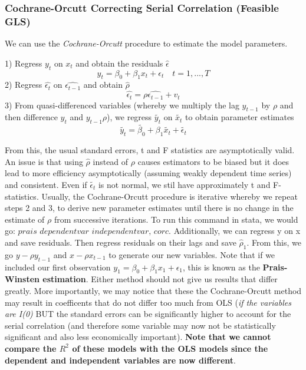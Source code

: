 \documentclass[11pt, oneside]{article}
\theoremstyle{definition}
\begin{document}
\subsubsection{Cochrane-Orcutt Correcting Serial Correlation (Feasible GLS)}
We can use the \textit{Cochrane-Orcutt} procedure to estimate the model parameters.

\begin{center}
  1) Regress $y_t$ on $x_t$ and obtain the residuals $\hat{\epsilon}$
$$
y_t = \beta_0 + \beta_1 x_t + \epsilon_t \quad t=1,...,T
$$
  2) Regress $\hat{\epsilon_t}$ on $\hat{\epsilon_{t-1}}$ and obtain $\hat{\rho}$
$$
\hat{\epsilon_t} = \rho \hat{\epsilon_{t-1}} + v_t
$$
  3) From quasi-differenced variables (whereby we multiply the lag $y_{t-1}$ by $\rho$ and then difference $y_t$ and $y_{t-1}\rho$), we regress $\tilde{y_t}$ on $\tilde{x_t}$ to obtain parameter estimates
$$
\tilde{y_t} = \tilde{\beta_0} + \beta_1 \tilde{x_t} + \tilde{\epsilon_t}
$$
\end{center}

From this, the usual standard errors, t and F statistics are asymptotically valid. An issue is that using $\hat{\rho}$ instead of $\rho$ causes estimators to be biased but it does lead to more efficiency asymptotically (assuming weakly dependent time series) and consistent. Even if $\tilde{\epsilon_t}$ is not normal, we stil have approximately t and F-statistics. Usually, the Cochrane-Orcutt procedure is iterative whereby we repeat steps 2 and 3, to derive new parameter estimates until there is no change in the estimate of $\rho$ from successive iterations. To run this command in stata, we would go: $\textit{prais dependentvar independentvar, corc}$. Additionally, we can regress y on x and save residuals. Then regress residuals on their lags and save $\hat{\rho}_1$. From this, we go $y - \rho y_{t-1}$ and $x - \rho x_{t-1}$ to generate our new variables. Note that if we included our first observation $y_1 = \beta_0 + \beta_1x_1 + \epsilon_1$, this is known as the \textbf{Prais-Winsten estimation}. Either method should not give us results that differ greatly. More importantly, we may notice that these the Cochrane-Orcutt method may result in coefficents that do not differ too much from OLS (\textit{if the variables are I(0)} BUT the standard errors can be significantly higher to account for the serial correlation (and therefore some variable may now not be statistically significant and also less economically important). \textbf{Note that we cannot compare the $R^2$ of these models with the OLS models since the dependent and independent variables are now different}.
\end{document}
